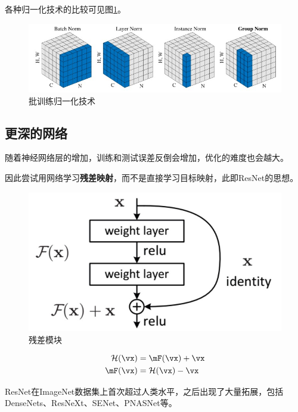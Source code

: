 各种归一化技术的比较可见图\ref{fig:normalization}。
\begin{figure}[H]
\centering
\includegraphics[width=0.8\linewidth]{fig/normalization.jpg}
\caption{批训练归一化技术}
\label{fig:normalization}
\end{figure}

\subsection{更深的网络}
随着神经网络层的增加，训练和测试误差反倒会增加\cite{he:identity_resnet_2016}，优化的难度也会越大。

因此尝试用网络学习\textbf{残差映射}，而不是直接学习目标映射，此即ResNet\cite{he:resnet_2016}的思想。
\begin{figure}[H]
\centering
\includegraphics[width=0.5\linewidth]{fig/residual_block.jpg}
\caption{残差模块}
\end{figure}
\[\begin{aligned}
\mathcal{H}(\vx) &= \mF(\vx)+\vx\\
\mF(\vx) &= \mathcal{H}(\vx)-\vx
\end{aligned}\]

ResNet在ImageNet数据集上首次超过人类水平，之后出现了大量拓展，包括DenseNets\cite{huang:densenet_2017}、ResNeXt\cite{xie:resnext_2017}、SENet\cite{hu:senet_2018}、PNASNet\cite{liu:pnasnet}等。